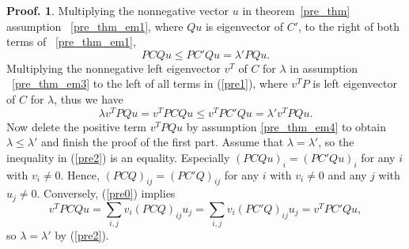 \documentclass[12pt]{report}%
\theoremstyle{plain}
\theoremstyle{definition}
\newtheorem{pof}[thm]{Proof.}
\begin{document}
\begin{pof}
    Multiplying the nonnegative vector $u$ in theorem~\ref{pre_thm} assumption
    ~\ref{pre_thm_em1}, where $Qu$ is eigenvector of $C'$,  to the right of both terms of
    ~\ref{pre_thm_em1},
    \begin{equation}\label{pre1}
        PCQu\leq PC'Qu=\lambda'PQu.
    \end{equation}
    Multiplying the nonnegative left eigenvector $v^T$ of $C$ for $\lambda$ in assumption
    ~\ref{pre_thm_em3} to the left of all terms  in (\ref{pre1}), where $v^TP$ is
    left eigenvector of $C$ for $\lambda$, thus we have
    \begin{equation}\label{pre2}
        \lambda v^TPQu=v^TPCQu\leq v^TPC'Qu=\lambda' v^TPQu.
    \end{equation}
        Now delete the positive term $v^TPQu$ by assumption \ref{pre_thm_em4} to obtain
         $\lambda\leq \lambda'$ and finish the proof of the first part.
    Assume that $\lambda=\lambda'$, so the inequality in (\ref{pre2}) is an equality.
    Especially $(PCQu)_i=(PC'Qu)_i$ for any $i$ with $v_i\not=0.$ Hence,
    $(PCQ)_{ij}=(PC'Q)_{ij}$ for any $i$ with $v_i\not=0$ and any $j$ with
    $u_j\not=0.$ Conversely, (\ref{pre0}) implies $$v^TPCQu=\sum_{i,j} v_i(PCQ)_{ij}u_j=
    \sum_{i,j} v_i(PC'Q)_{ij}u_j=v^TPC'Qu,$$ so $\lambda=\lambda'$ by (\ref{pre2}).

 \end{pof}
\end{document}

